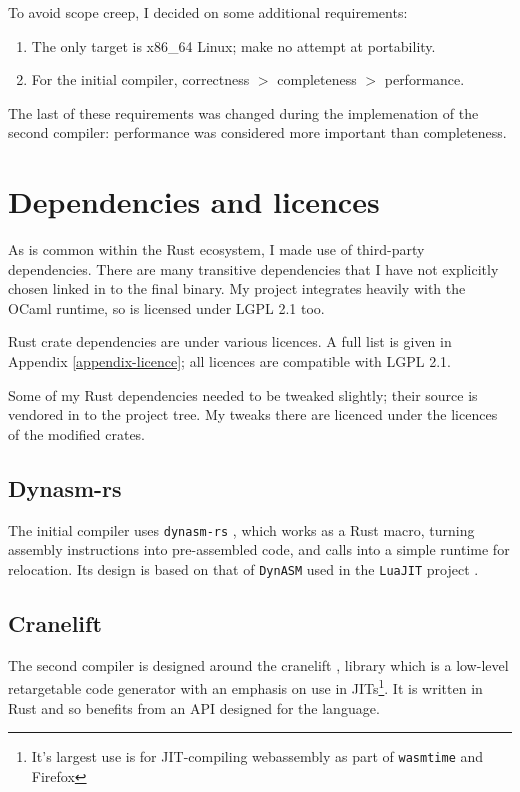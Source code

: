 To avoid scope creep, I decided on some additional requirements:

\begin{enumerate}
    \item The only target is x86\_64 Linux; make no attempt at portability.
    \item For the initial compiler, correctness $>$ completeness $>$ performance.
\end{enumerate}

The last of these requirements was changed during the implemenation of the second compiler:
performance was considered more important than completeness.

\section{Dependencies and licences}

As is common within the Rust ecosystem, I made use of third-party dependencies. There are many
transitive dependencies that I have not explicitly chosen linked in to the final binary. My project
integrates heavily with the OCaml runtime, so is licensed under LGPL 2.1 too.

Rust crate dependencies are under various licences. A full list is given in Appendix
\ref{appendix-licence}; all licences are compatible with LGPL 2.1.

Some of my Rust dependencies needed to be tweaked slightly; their source is
vendored in to the project tree. My tweaks there are licenced under the licences of the modified
crates.

\subsection{Dynasm-rs}

The initial compiler uses \texttt{dynasm-rs} \cite{dynasmrs}, which works as a Rust macro, turning
assembly instructions into pre-assembled code, and calls into a simple runtime for relocation. Its
design is based on that of \texttt{DynASM} used in the \texttt{LuaJIT} project \cite{dynasm}.

\subsection{Cranelift}

The second compiler is designed around the cranelift \cite{cranelift}, library which is a
low-level retargetable code generator with an emphasis on use in JITs\footnote{It's largest use is
    for JIT-compiling webassembly as part of \texttt{wasmtime} and Firefox}. It is written in Rust
and so benefits from an API designed for the language.

